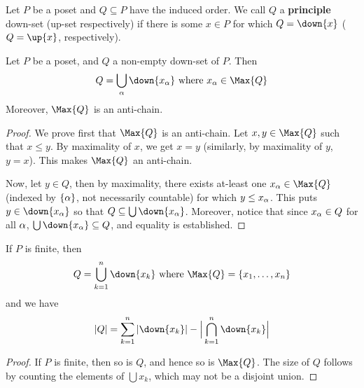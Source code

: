 \begin{definition}
  Let $P$ be a poset and $Q \subseteq P$ have the induced order. We
  call $Q$ a \textbf{principle} down-set (up-set respectively) if
  there is some $x \in P$ for which $Q=\down{x}$ ($Q=\up{x}$,
  respectively).
\end{definition}

\begin{proposition}\label{proposition_1.6.2}
  Let $P$ be a poset, and $Q$ a non-empty down-set of  $P$. Then
  \begin{equation*}
    Q=\bigcup_{\a}{\down{x_\a}} \text{ where } x_\a \in \Max{Q}
  \end{equation*}
  Moreover, $\Max{Q}$ is an anti-chain.
\end{proposition}
\begin{proof}
  We prove first that $\Max{Q}$ is an anti-chain. Let $x,y \in
  \Max{Q}$ such that $x \leq y$. By maximality of $x$, we get  $x=y$
  (similarly, by maximality of $y$,  $y=x$). This makes $\Max{Q}$ an
  anti-chain.

  Now, let $y \in Q$, then by maximality, there exists at-least one
  $x_\a \in \Max{Q}$ (indexed by $\{\alpha\}$, not necessarily countable)
  for which $y \leq x_\alpha$. This puts $y \in \down{x_\a}$ so that $Q
  \subseteq \bigcup{\down{x_\a}}$. Moreover, notice that since $x_\alpha
  \in Q$ for all $\alpha$,  $\bigcup{\down{x_\a}} \subseteq Q$, and
  equality is established.
\end{proof}
\begin{corollary}
  If $P$ is finite, then
  \begin{equation*}
    Q=\bigcup_{k=1}^n{\down{x_k}} \text{ where } \Max{Q}=\{x_1, \dots,
    x_n\}
  \end{equation*}
  and we have
  \begin{equation*}
    |Q|=\sum_{k=1}^n{|\down{x_k}|}-\Big{|} \bigcap_{k=1}^n{\down{x_k}} \Big{|}
  \end{equation*}
\end{corollary}
\begin{proof}
  If $P$ is finite, then so is $Q$, and hence so is $\Max{Q}$. The
  size of $Q$ follows by counting the elements of $\bigcup{x_k}$,
  which may not be a disjoint union.
\end{proof}

